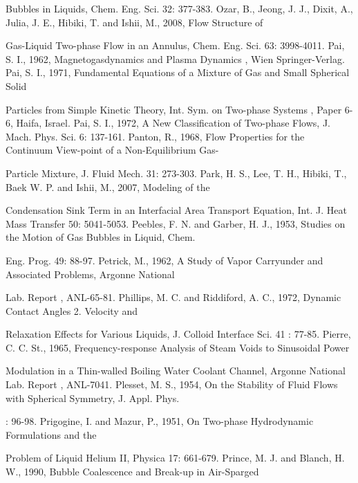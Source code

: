 \documentclass[11pt,a4paper,openany,fontset=none]{ctexbook}
\begin{document}
{\small\raggedright\noindent Bubbles in Liquids, Chem. Eng. Sci. 32: 377-383. Ozar, B., Jeong, J. J., Dixit, A., Julia, J. E., Hibiki, T. and Ishii, M., 2008, Flow Structure of\par}
{\small\raggedright\noindent Gas-Liquid Two-phase Flow in an Annulus, Chem. Eng. Sci. 63: 3998-4011. Pai, S. I., 1962, Magnetogasdynamics and Plasma Dynamics , Wien Springer-Verlag. Pai, S. I., 1971, Fundamental Equations of a Mixture of Gas and Small Spherical Solid\par}
{\small\raggedright\noindent Particles from Simple Kinetic Theory, Int. Sym. on Two-phase Systems , Paper 6-6, Haifa, Israel. Pai, S. I., 1972, A New Classification of Two-phase Flows, J. Mach. Phys. Sci. 6: 137-161. Panton, R., 1968, Flow Properties for the Continuum View-point of a Non-Equilibrium Gas-\par}
{\small\raggedright\noindent Particle Mixture, J. Fluid Mech. 31: 273-303. Park, H. S., Lee, T. H., Hibiki, T., Baek W. P. and Ishii, M., 2007, Modeling of the\par}
{\small\raggedright\noindent Condensation Sink Term in an Interfacial Area Transport Equation, Int. J. Heat Mass Transfer 50: 5041-5053. Peebles, F. N. and Garber, H. J., 1953, Studies on the Motion of Gas Bubbles in Liquid, Chem.\par}
{\small\raggedright\noindent Eng. Prog. 49: 88-97. Petrick, M., 1962, A Study of Vapor Carryunder and Associated Problems, Argonne National\par}
{\small\raggedright\noindent Lab. Report , ANL-65-81. Phillips, M. C. and Riddiford, A. C., 1972, Dynamic Contact Angles 2. Velocity and\par}
{\small\raggedright\noindent Relaxation Effects for Various Liquids, J. Colloid Interface Sci. 41 : 77-85. Pierre, C. C. St., 1965, Frequency-response Analysis of Steam Voids to Sinusoidal Power\par}
{\small\raggedright\noindent Modulation in a Thin-walled Boiling Water Coolant Channel, Argonne National Lab. Report , ANL-7041. Plesset, M. S., 1954, On the Stability of Fluid Flows with Spherical Symmetry, J. Appl. Phys.\par}
{\small\raggedright{}: 96-98. Prigogine, I. and Mazur, P., 1951, On Two-phase Hydrodynamic Formulations and the\par}
{\small\raggedright\noindent Problem of Liquid Helium II, Physica 17: 661-679. Prince, M. J. and Blanch, H. W., 1990, Bubble Coalescence and Break-up in Air-Sparged\par}
\end{document}
